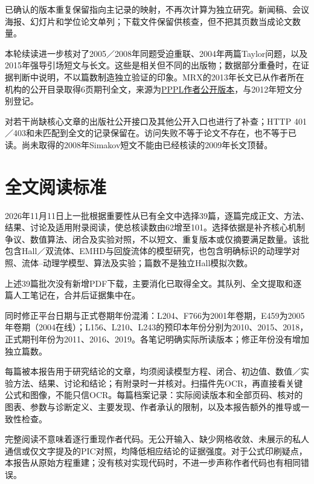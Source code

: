 已确认的版本重复保留指向主记录的映射，不再次计算为独立研究。新闻稿、会议海报、幻灯片和学位论文单列；下载文件保留供核查，但不把其页数当成论文数量。

本轮续读进一步核对了2005／2008年同题受迫重联、2004年两篇Taylor问题，以及2015年强导引场短文与长文。这些是相关但不同的出版物；数据部分重叠时，在证据判断中说明，不以篇数制造独立验证的印象。MRX的2013年长文已从作者所在机构的公开目录取得6页期刊全文，来源为\href{https://w3.pppl.gov/~hji/paper/Tharp13.pdf}{PPPL作者公开版本}，与2012年短文分别登记。

对若干尚缺核心文章的出版社公开接口及其他公开入口也进行了补查；HTTP 401／403和未匹配到全文的记录保留在。访问失败不等于论文不存在，也不等于已读。尚未取得的2008年Simakov短文不能由已经核读的2009年长文顶替。

\section{全文阅读标准}
2026年11月11日上一批根据重要性从已有全文中选择39篇，逐篇完成正文、方法、结果、讨论及适用附录阅读，使总核读数由62增至101。选择依据是补齐核心机制争议、数值算法、闭合及实验对照，不以短文、重复版本或仅摘要满足数量。该批包含Hall／双流体、EMHD与回旋流体的模型研究，也包含明确标识的动理学对照、流体--动理学模型、算法及实验；篇数不是独立Hall模拟次数。

上述39篇批次没有新增PDF下载，主要消化已取得全文。其队列、全文提取和逐篇人工笔记在，合并后证据集中在。

同时修正平台日期与正式卷期年份混淆：L204、F766为2001年卷期，E459为2005年卷期（2004在线）；L156、L210、L243的预印本年份分别为2010、2015、2018，正式期刊年份为2011、2016、2019。各笔记明确实际所读版本；修正年份没有增加独立篇数。

每篇被本报告用于研究结论的文章，均须阅读模型方程、闭合、初边值、数值／实验方法、结果、讨论和结论；有附录时一并核对。扫描件先OCR，再直接看关键公式和图像，不能只信OCR。每篇档案记录：实际阅读版本和全部页码、核对的图表、参数与诊断定义、主要发现、作者承认的限制，以及本报告额外的推导或一致性检查。

完整阅读不意味着逐行重现作者代码。无公开输入、缺少网格收敛、未展示的私人通信或仅文字提及的PIC对照，均降低相应结论的证据强度。对于公式印刷疑点，本报告从原始方程重建；没有核对实现代码时，不进一步声称作者代码也有相同错误。

